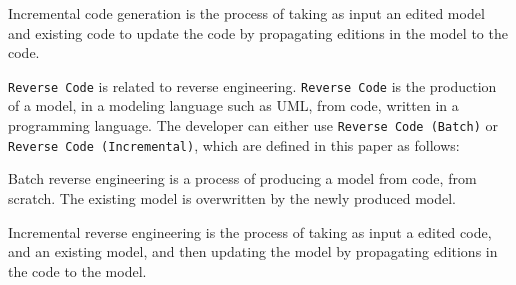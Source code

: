 


\begin{definition}
	Incremental code generation is the process
	of taking as input an edited model and existing code to update the code by propagating
	editions in the model to the code.
\end{definition}

\texttt{Reverse Code} is related to reverse engineering.
\texttt{Reverse Code} is the production of a model, in a modeling language such as UML, from code, written in a programming language.
The developer can either use \texttt{Reverse Code (Batch)} or \texttt{Reverse Code (Incremental)}, which are defined in this paper as follows:

\begin{definition}
	Batch reverse engineering is a process of producing a model from code, from scratch.
	The existing model is overwritten by the newly produced model.
\end{definition}

\begin{definition}
	Incremental reverse engineering is the process of taking as
	input a edited code, and an existing model, and then updating the model by propagating
	editions in the code to the model.
\end{definition}


